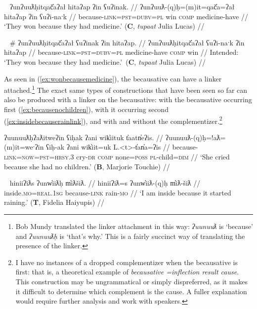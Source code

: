 \ex~ \label{ex:wonbecausemedicine}
\begingl
\glpreamble ʔunʔuuƛḥitqač̓aʔał hitaʔap ʔin ʕuʔinak. //
\gla ʔunʔuuƛ-(q)ḥ=(m)it=qač̓a=ʔał hitaʔap ʔin ʕuʔi-naˑk //
\glb because-\textsc{link}=\textsc{pst}=\textsc{dubv}=\textsc{pl} win \textsc{comp} medicine-have //
\glft `They won because they had medicine.' (\textbf{C}, \textit{tupaat} Julia Lucas) //
\endgl
\xe

\ex~ \label{ex:*wonbecausemedicine}
\begingl
\glpreamble \# ʔunʔuuƛḥitqač̓aʔał ʕuʔinak ʔin hitaʔap. //
\gla ʔunʔuuƛḥitqač̓aʔał ʕuʔi-naˑk ʔin hitaʔap //
\glb because-\textsc{link}=\textsc{pst}=\textsc{dubv}=\textsc{pl} medicine-have \textsc{comp} win //
\glft Intended: `They won because they had medicine.'\footnotemark\ (\textbf{C}, \textit{tupaat} Julia Lucas) //
\endgl
\xe


As seen in (\ref{ex:wonbecausemedicine}), the becausative can have a linker attached.\footnote{Bob Mundy translated the linker attachment in this way: \textit{ʔuunuuƛ} is `because' and \textit{ʔuunuuƛḥ} is `that's why.' This is a fairly succinct way of translating the presence of the linker.} The exact same types of constructions that have been seen so far can also be produced with a linker on the becausative: with the becausative occurring first (\ref{ex:becausenochildren}), with it occurring second (\ref{ex:insidebecauserainlink}), and with and without the complementizer.\footnote{I have no instances of a dropped complementizer when the becausative is first: that is, a theoretical example of \textit{becausative =inflection result cause}. This construction may be ungrammatical or simply dispreferred, as it makes it difficult to determine which complement is the cause. A fuller explanation would require further analysis and work with speakers.}

\ex \label{ex:becausenochildren}
\begingl
\glpreamble ʔuunuuƛḥʔaƛitweʔin ʕiḥak ʔani wik̓iituk t̓aatn̓eʔis. //
\gla ʔuunuuƛ-(q)ḥ=!aƛ=(m)it=weˑʔin ʕiḥ-ak ʔani wik̓iit=uk L.<t>-t̓an̓a=ʔis //
\glb because-\textsc{link}=\textsc{now}=\textsc{pst}=\textsc{hrsy.3} cry-\textsc{dr} \textsc{comp} none=\textsc{poss} \textsc{pl}-child=\textsc{dim} //
\glft `She cried because she had no children.' (\textbf{B}, Marjorie Touchie) //
\endgl
\xe

\ex~ \label{ex:insidebecauserainlink}
\begingl
\glpreamble hiniiʔiƛs ʔunw̓iiƛḥ m̓iƛšiƛ. //
\gla hiniiʔiƛ=s ʔunw̓iiƛ-(q)ḥ m̓iƛ-šiƛ //
\glb inside.\textsc{mo}=\textsc{real.1sg} because-\textsc{link} rain-\textsc{mo} //
\glft `I am inside because it started raining.' (\textbf{T}, Fidelia Haiyupis) //
\endgl
\xe

